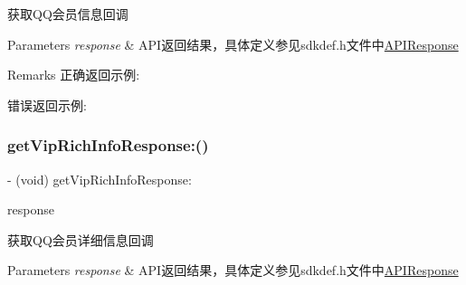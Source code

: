 获取\+Q\+Q会员信息回调 
\begin{DoxyParams}{Parameters}
{\em response} & A\+P\+I返回结果，具体定义参见sdkdef.\+h文件中\mbox{\hyperlink{interface_a_p_i_response}{A\+P\+I\+Response}} \\
\hline
\end{DoxyParams}
\begin{DoxyRemark}{Remarks}
正确返回示例\+: 
\begin{DoxyCodeInclude}
\end{DoxyCodeInclude}
 错误返回示例\+: 
\begin{DoxyCodeInclude}
\end{DoxyCodeInclude}

\end{DoxyRemark}
\mbox{\label{protocol_tencent_session_delegate-p_aa6c9ad57c523c339220224ed84c22bf3}} 
\subsubsection{\texorpdfstring{get\+Vip\+Rich\+Info\+Response\+:()}{getVipRichInfoResponse:()}\hspace{0.1cm}{\footnotesize\ttfamily [1/2]}}
{\footnotesize\ttfamily -\/ (void) get\+Vip\+Rich\+Info\+Response\+: \begin{DoxyParamCaption}\item[{(\mbox{\hyperlink{interface_a_p_i_response}{A\+P\+I\+Response}} $\ast$)}]{response }\end{DoxyParamCaption}\hspace{0.3cm}{\ttfamily [optional]}}

获取\+Q\+Q会员详细信息回调 
\begin{DoxyParams}{Parameters}
{\em response} & A\+P\+I返回结果，具体定义参见sdkdef.\+h文件中\mbox{\hyperlink{interface_a_p_i_response}{A\+P\+I\+Response}} \\
\hline
\end{DoxyParams}
\mbox{\label{protocol_tencent_session_delegate-p_aa6c9ad57c523c339220224ed84c22bf3}} 
